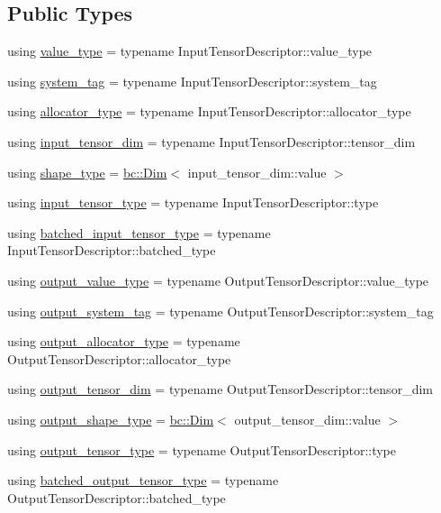 \subsection*{Public Types}
\begin{DoxyCompactItemize}
\item 
using \hyperlink{structbc_1_1nn_1_1Layer__Base_a64df0ea9c50a4d6dcf59483cc797c393}{value\+\_\+type} = typename Input\+Tensor\+Descriptor\+::value\+\_\+type
\item 
using \hyperlink{structbc_1_1nn_1_1Layer__Base_a17374088839df88dbc0c4b16fb678711}{system\+\_\+tag} = typename Input\+Tensor\+Descriptor\+::system\+\_\+tag
\item 
using \hyperlink{structbc_1_1nn_1_1Layer__Base_ab5858d575f0bddc2ef5fc1f9af287866}{allocator\+\_\+type} = typename Input\+Tensor\+Descriptor\+::allocator\+\_\+type
\item 
using \hyperlink{structbc_1_1nn_1_1Layer__Base_a12d1f8cb3fac0409305a38b37ba1ccd2}{input\+\_\+tensor\+\_\+dim} = typename Input\+Tensor\+Descriptor\+::tensor\+\_\+dim
\item 
using \hyperlink{structbc_1_1nn_1_1Layer__Base_ab8cbdaad20a0270b2555a91676a79932}{shape\+\_\+type} = \hyperlink{structbc_1_1Dim}{bc\+::\+Dim}$<$ input\+\_\+tensor\+\_\+dim\+::value $>$
\item 
using \hyperlink{structbc_1_1nn_1_1Layer__Base_a0f7ef852a6ab48c732c099eb4108b43d}{input\+\_\+tensor\+\_\+type} = typename Input\+Tensor\+Descriptor\+::type
\item 
using \hyperlink{structbc_1_1nn_1_1Layer__Base_abec4d65c97cd813612fc8e86657e1b81}{batched\+\_\+input\+\_\+tensor\+\_\+type} = typename Input\+Tensor\+Descriptor\+::batched\+\_\+type
\item 
using \hyperlink{structbc_1_1nn_1_1Layer__Base_a599bd6711b2c80475d912ab4c4638170}{output\+\_\+value\+\_\+type} = typename Output\+Tensor\+Descriptor\+::value\+\_\+type
\item 
using \hyperlink{structbc_1_1nn_1_1Layer__Base_a0a8227e1026be7581efc05cdc52fa052}{output\+\_\+system\+\_\+tag} = typename Output\+Tensor\+Descriptor\+::system\+\_\+tag
\item 
using \hyperlink{structbc_1_1nn_1_1Layer__Base_aca74d834a3499b69d2aa7f596a76a9c4}{output\+\_\+allocator\+\_\+type} = typename Output\+Tensor\+Descriptor\+::allocator\+\_\+type
\item 
using \hyperlink{structbc_1_1nn_1_1Layer__Base_ad855e04b19ef691641857a3e03f9c171}{output\+\_\+tensor\+\_\+dim} = typename Output\+Tensor\+Descriptor\+::tensor\+\_\+dim
\item 
using \hyperlink{structbc_1_1nn_1_1Layer__Base_a09221e8c188d9635fdaf6bfb21ed2026}{output\+\_\+shape\+\_\+type} = \hyperlink{structbc_1_1Dim}{bc\+::\+Dim}$<$ output\+\_\+tensor\+\_\+dim\+::value $>$
\item 
using \hyperlink{structbc_1_1nn_1_1Layer__Base_a5e6970042ccdf89ae26040f527550314}{output\+\_\+tensor\+\_\+type} = typename Output\+Tensor\+Descriptor\+::type
\item 
using \hyperlink{structbc_1_1nn_1_1Layer__Base_a5dbb24a3cc7949d33ca9f4edbfbe871a}{batched\+\_\+output\+\_\+tensor\+\_\+type} = typename Output\+Tensor\+Descriptor\+::batched\+\_\+type
\end{DoxyCompactItemize}
